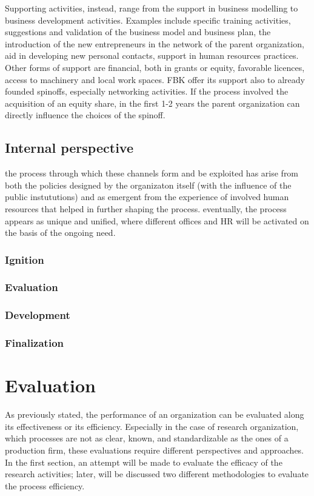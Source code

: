 Supporting activities, instead, range from the support in business modelling to business development activities. Examples include specific training activities, suggestions and validation of the business model and business plan, the introduction of the new entrepreneurs in the network of the parent organization, aid in developing new personal contacts, support in human resources practices. Other forms of support are financial, both in grants or equity, favorable licences, access to machinery and local work spaces. FBK offer its support also to already founded spinoffs, especially networking activities. If the process involved the acquisition of an equity share, in the first 1-2 years the parent organization can directly influence the choices of the spinoff.

\subsection{Internal perspective}

the process through which these channels form and be exploited has arise from both the policies designed by the organizaton itself (with the influence of the public instututions) and as emergent from the experience of involved human resources that helped in further shaping the process. eventually, the process appears as unique and unified, where different offices and HR will be activated on the basis of the ongoing need. 

\subsubsection{Ignition}
\subsubsection{Evaluation}
\subsubsection{Development}
\subsubsection{Finalization}

\section{Evaluation}

As previously stated, the performance of an organization can be evaluated along its effectiveness or its efficiency. Especially in the case of research organization, which processes are not as clear, known, and standardizable as the ones of a production firm, these evaluations require different perspectives and approaches. In the first section, an attempt will be made to evaluate the efficacy of the research activities; later, will be discussed two different methodologies to evaluate the process efficiency. 

